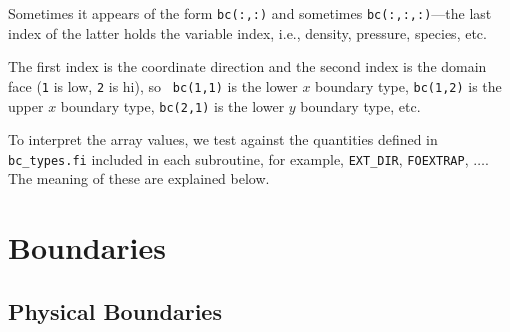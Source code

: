\begin{itemize}
\begin{itemize}
    Sometimes it appears of the form {\tt bc(:,:)} and sometimes
    {\tt bc(:,:,:)}---the last index of the latter holds the variable
    index, i.e., density, pressure, species, etc.

    The first index is the coordinate direction and the second index
    is the domain face ({\tt 1} is low, {\tt 2} is hi), so {\tt
    bc(1,1)} is the lower $x$ boundary type, {\tt bc(1,2)} is
    the upper $x$ boundary type, {\tt bc(2,1)} is the lower
    $y$ boundary type, etc.

    To interpret the array values, we test against the quantities
    defined in {\tt bc\_types.fi} included in each subroutine,
    for example, {\tt EXT\_DIR}, {\tt FOEXTRAP}, $\ldots$.  The
    meaning of these are explained below.

  \end{itemize}

\end{itemize}


\section{Boundaries}

\subsection{Physical Boundaries}


